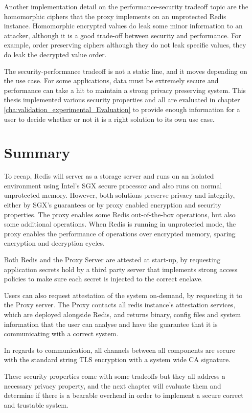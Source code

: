 Another implementation detail on the performance-security tradeoff topic are the homomorphic ciphers that the proxy implements on an unprotected Redis instance. Homomorphic encrypted values do leak some minor information to an attacker, although it is a good trade-off between security and performance. For example, order preserving ciphers although they do not leak specific values, they do leak the decrypted value order.

The security-performance tradeoff is not a static line, and it moves depending on the use case. For some applications, data must be extremely secure and performance can take a hit to maintain a strong privacy preserving system. This thesis implemented various security properties and all are evaluated in chapter \ref{cha:validation_experimental_Evaluation} to provide enough information for a user to decide whether or not it is a right solution to its own use case.


\section{Summary}
\label{sec:chapter4_summary}

To recap, Redis will server as a storage server and runs on an isolated environment using Intel's \gls{SGX} secure processor and also runs on normal unprotected memory. However, both solutions preserve privacy and integrity, either by \gls{SGX}'s guarantees or by proxy enabled encryption and security properties. The proxy enables some Redis out-of-the-box operations, but also some additional operations. When Redis is running in unprotected mode, the proxy enables the performance of operations over encrypted memory, sparing encryption and decryption cycles.

Both Redis and the Proxy Server are attested at start-up, by requesting application secrets hold by a third party server that implements strong access policies to make sure each secret is injected to the correct enclave. 

Users can also request attestation of the system on-demand, by requesting it to the Proxy server. The Proxy contacts all redis instance's attestation services, which are deployed alongside Redis, and returns binary, config files and system information that the user can analyse and have the guarantee that it is communicating with a correct system.

In regards to communication, all channels between all components are secure with the standard string TLS encryption with a system wide CA signature.

These security properties come with some tradeoffs but they all address a necessary privacy property, and the next chapter will evaluate them and determine if there is a bearable overhead in order to implement a secure correct and trustable system.